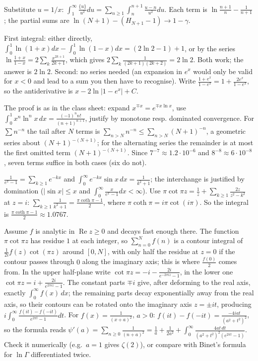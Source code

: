 \documentclass[11pt,a4paper]{article}
\begin{document}
Substitute \(u=1/x\): \(\int_1^\infty\frac{\{u\}}{u^2}du=\sum_{n\ge1}\int_n^{n+1}\frac{u-n}{u^2}du\).
Each term is \(\ln\frac{n+1}n-\frac1{n+1}\); the partial sums are \(\ln(N+1)-(H_{N+1}-1)\to1-\gamma\).

First integral: either directly, \(\int_0^1\ln(1+x)dx-\int_0^1\ln(1-x)dx=(2\ln2-1)+1\), or by the series \(\ln\frac{1+x}{1-x}=2\sum_k\frac{x^{2k+1}}{2k+1}\), which gives \(2\sum_k\frac1{(2k+1)(2k+2)}=2\ln2\). Both work; the answer is \(2\ln2\).
Second: no series needed (an expansion in \(e^x\) would only be valid for \(x\lt0\) and lead to a sum you then have to recognise). Write \(\frac{1+e^x}{1-e^x}=1+\frac{2e^x}{1-e^x}\), so the antiderivative is \(x-2\ln\lvert1-e^x\rvert+C\).

The proof is as in the class sheet: expand \(x^{\mp x}=e^{\mp x\ln x}\), use \(\int_0^1x^n\ln^nx\,dx=\frac{(-1)^nn!}{(n+1)^{n+1}}\), justify by monotone resp. dominated convergence.
For \(\sum n^{-n}\) the tail after \(N\) terms is \(\sum_{n\gt N}n^{-n}\le\sum_{n\gt N}(N+1)^{-n}\), a geometric series about \((N+1)^{-(N+1)}\); for the alternating series the remainder is at most the first omitted term \((N+1)^{-(N+1)}\). Since \(7^{-7}\approx1.2\cdot10^{-6}\) and \(8^{-8}\approx6\cdot10^{-8}\), seven terms suffice in both cases (six do not).

\(\frac1{e^x-1}=\sum_{k\ge1}e^{-kx}\) and \(\int_0^\infty e^{-kx}\sin x\,dx=\frac1{k^2+1}\); the interchange is justified by domination (\(\lvert\sin x\rvert\le x\) and \(\int_0^\infty\frac{x}{e^x-1}dx\lt\infty\)).
Use \(\pi\cot\pi z=\frac1z+\sum_{k\ge1}\frac{2z}{z^2-k^2}\) at \(z=i\): \(\sum_{k\ge1}\frac1{k^2+1}=\frac{\pi\coth\pi-1}2\), where \(\pi\coth\pi=i\pi\cot(i\pi)\). So the integral is \(\frac{\pi\coth\pi-1}2\approx1.0767\).

Assume \(f\) is analytic in \(\operatorname{Re}z\ge0\) and decays fast enough there. The function \(\pi\cot\pi z\) has residue \(1\) at each integer, so \(\sum_{n=0}^Nf(n)\) is a contour integral of \(\frac1{2i}f(z)\cot(\pi z)\) around \([0,N]\), with only half the residue at \(z=0\) if the contour passes through \(0\) along the imaginary axis; this is where \(\frac{f(0)}2\) comes from.
In the upper half-plane write \(\cot\pi z=-i-\frac{2i}{e^{-2\pi iz}-1}\), in the lower one \(\cot\pi z=i+\frac{2i}{e^{2\pi iz}-1}\). The constant parts \(\mp i\) give, after deforming to the real axis, exactly \(\int_0^\infty f(x)\,dx\); the remaining parts decay exponentially away from the real axis, so their contours can be rotated onto the imaginary axis \(z=\pm it\), producing \(i\int_0^\infty\frac{f(it)-f(-it)}{e^{2\pi t}-1}dt\).
For \(f(x)=\frac1{(x+a)^2}\), \(a\gt0\): \(f(it)-f(-it)=\frac{-4iat}{(a^2+t^2)^2}\), so the formula reads \(\psi'(a)=\sum_{n\ge0}\frac1{(n+a)^2}=\frac1a+\frac1{2a^2}+\int_0^\infty\frac{4at\,dt}{(a^2+t^2)^2(e^{2\pi t}-1)}\). Check it numerically (e.g.~\(a=1\) gives \(\zeta(2)\)), or compare with Binet's formula for \(\ln\Gamma\) differentiated twice.
\end{document}
